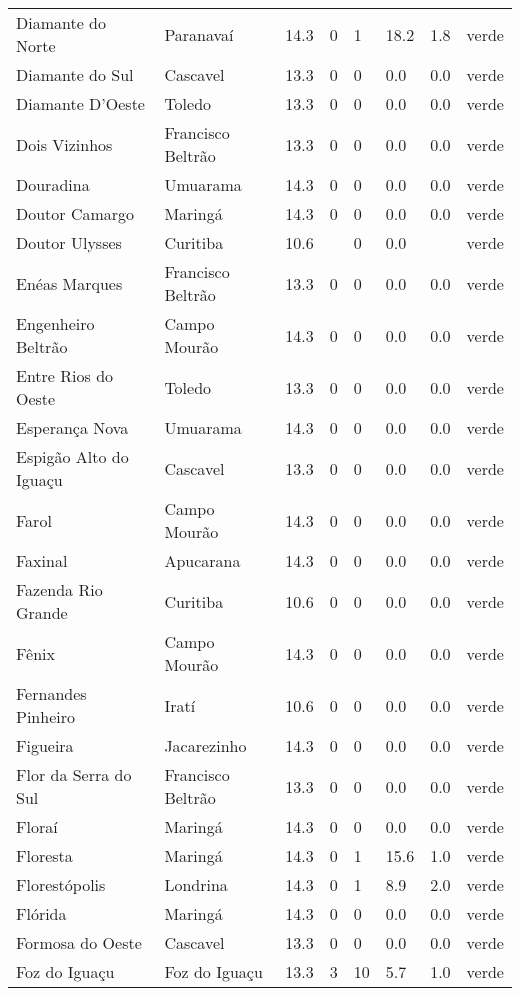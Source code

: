 \begin{longtable}{l|lllllll}
  Diamante do Norte & Paranavaí & 14.3 & 0 & 1 & 18.2 & 1.8 & verde \\ 
  Diamante do Sul & Cascavel & 13.3 & 0 & 0 & 0.0 & 0.0 & verde \\ 
  Diamante D'Oeste & Toledo & 13.3 & 0 & 0 & 0.0 & 0.0 & verde \\ 
  Dois Vizinhos & Francisco Beltrão & 13.3 & 0 & 0 & 0.0 & 0.0 & verde \\ 
  Douradina & Umuarama & 14.3 & 0 & 0 & 0.0 & 0.0 & verde \\ 
  Doutor Camargo & Maringá & 14.3 & 0 & 0 & 0.0 & 0.0 & verde \\ 
  Doutor Ulysses & Curitiba & 10.6 &  & 0 & 0.0 &  & verde \\ 
  Enéas Marques & Francisco Beltrão & 13.3 & 0 & 0 & 0.0 & 0.0 & verde \\ 
  Engenheiro Beltrão & Campo Mourão & 14.3 & 0 & 0 & 0.0 & 0.0 & verde \\ 
  Entre Rios do Oeste & Toledo & 13.3 & 0 & 0 & 0.0 & 0.0 & verde \\ 
  Esperança Nova & Umuarama & 14.3 & 0 & 0 & 0.0 & 0.0 & verde \\ 
  Espigão Alto do Iguaçu & Cascavel & 13.3 & 0 & 0 & 0.0 & 0.0 & verde \\ 
  Farol & Campo Mourão & 14.3 & 0 & 0 & 0.0 & 0.0 & verde \\ 
  Faxinal & Apucarana & 14.3 & 0 & 0 & 0.0 & 0.0 & verde \\ 
  Fazenda Rio Grande & Curitiba & 10.6 & 0 & 0 & 0.0 & 0.0 & verde \\ 
  Fênix & Campo Mourão & 14.3 & 0 & 0 & 0.0 & 0.0 & verde \\ 
  Fernandes Pinheiro & Iratí & 10.6 & 0 & 0 & 0.0 & 0.0 & verde \\ 
  Figueira & Jacarezinho & 14.3 & 0 & 0 & 0.0 & 0.0 & verde \\ 
  Flor da Serra do Sul & Francisco Beltrão & 13.3 & 0 & 0 & 0.0 & 0.0 & verde \\ 
  Floraí & Maringá & 14.3 & 0 & 0 & 0.0 & 0.0 & verde \\ 
  Floresta & Maringá & 14.3 & 0 & 1 & 15.6 & 1.0 & verde \\ 
  Florestópolis & Londrina & 14.3 & 0 & 1 & 8.9 & 2.0 & verde \\ 
  Flórida & Maringá & 14.3 & 0 & 0 & 0.0 & 0.0 & verde \\ 
  Formosa do Oeste & Cascavel & 13.3 & 0 & 0 & 0.0 & 0.0 & verde \\ 
  Foz do Iguaçu & Foz do Iguaçu & 13.3 & 3 & 10 & 5.7 & 1.0 & verde \\ 

\end{longtable}
